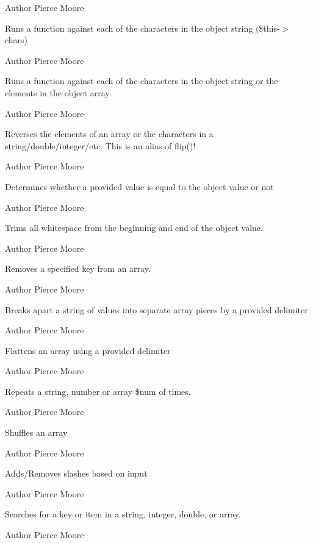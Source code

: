 \begin{DoxyAuthor}{Author}
Pierce Moore
\end{DoxyAuthor}
Runs a function against each of the characters in the object string (\$this-\/$>$chars)

\begin{DoxyAuthor}{Author}
Pierce Moore
\end{DoxyAuthor}
Runs a function against each of the characters in the object string or the elements in the object array.

\begin{DoxyAuthor}{Author}
Pierce Moore
\end{DoxyAuthor}
Reverses the elements of an array or the characters in a string/double/integer/etc. This is an alias of flip()!

\begin{DoxyAuthor}{Author}
Pierce Moore
\end{DoxyAuthor}
Determines whether a provided value is equal to the object value or not

\begin{DoxyAuthor}{Author}
Pierce Moore
\end{DoxyAuthor}
Trims all whitespace from the beginning and end of the object value.

\begin{DoxyAuthor}{Author}
Pierce Moore
\end{DoxyAuthor}
Removes a specified key from an array.

\begin{DoxyAuthor}{Author}
Pierce Moore
\end{DoxyAuthor}
Breaks apart a string of values into separate array pieces by a provided delimiter

\begin{DoxyAuthor}{Author}
Pierce Moore
\end{DoxyAuthor}
Flattens an array using a provided delimiter

\begin{DoxyAuthor}{Author}
Pierce Moore
\end{DoxyAuthor}
Repeats a string, number or array \$num of times.

\begin{DoxyAuthor}{Author}
Pierce Moore
\end{DoxyAuthor}
Shuffles an array

\begin{DoxyAuthor}{Author}
Pierce Moore
\end{DoxyAuthor}
Adds/\-Removes slashes based on input

\begin{DoxyAuthor}{Author}
Pierce Moore
\end{DoxyAuthor}
Searches for a key or item in a string, integer, double, or array.

\begin{DoxyAuthor}{Author}
Pierce Moore 
\end{DoxyAuthor}
